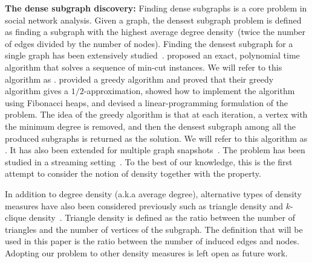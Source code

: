 \textbf{The dense subgraph discovery:}
Finding dense subgraphs is a core problem in social network analysis. 
Given a graph, the densest subgraph problem is defined as finding a subgraph with the highest average degree density~(twice the number of edges divided by the number of nodes).
Finding the densest subgraph for a single graph has been extensively studied~\cite{goldberg1984finding,charikar2000greedy,khuller2009finding}.
\citet{goldberg1984finding} proposed an exact,
polynomial time algorithm that solves a sequence of min-cut instances. We will refer to this algorithm as \algdg. \citet{asahiro2000greedily} provided a greedy algorithm and 
 \citet{charikar2000greedy} proved that their greedy algorithm gives a $1/2$-approximation, showed how to implement the algorithm using Fibonacci heaps, and devised a linear-programming formulation of the problem. The idea of the greedy algorithm is that at each iteration, a vertex with the minimum degree is removed, and then the densest
subgraph among all the produced subgraphs is returned as the solution. We will refer to this algorithm as \algdc. It has also been extended for multiple graph snapshots~\cite{jethava2015finding,semertzidis2019finding,arachchi2023jaccard}. The problem has been studied in a streaming setting~\cite{bhattacharya2015space}. 
To the best of our knowledge, this is the first attempt to consider the notion of density together with the \stc property.

In addition to degree density (a.k.a average degree), alternative types of density measures have also been considered previously such as triangle density and $k$-clique density~\cite{tsourakakis2015k}.
Triangle density is defined as the ratio between the number of triangles and the number of vertices of the subgraph.
The definition that will be used in this paper is the ratio between the number of induced edges and nodes.
Adopting our problem to other density measures is left open as future work.










